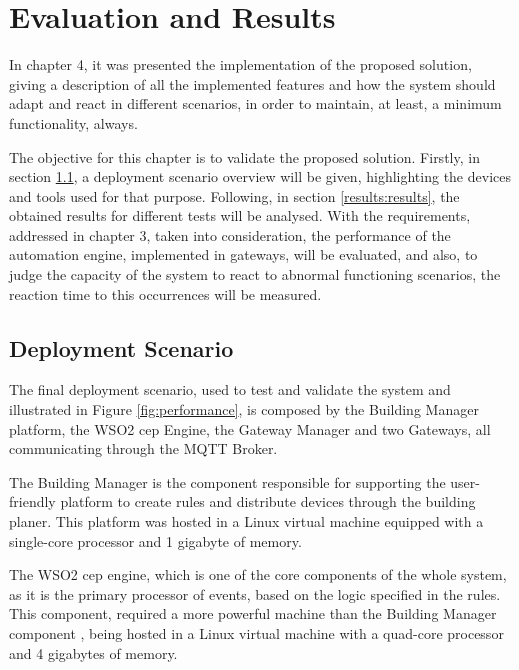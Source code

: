 \chapter{Evaluation and Results}
\label{chapter:evaluation_and_results}



In chapter 4, it was presented the implementation of the proposed solution, giving a description of all the implemented features and how the system should adapt and react in different scenarios, in order to maintain, at least, a minimum functionality, always.

The objective for this chapter is to validate the proposed solution. Firstly, in section \ref{results:scenario}, a deployment scenario overview will be given, highlighting the devices and tools used for that purpose. Following, in section \ref{results:results}, the obtained results for different tests will be analysed. With the requirements, addressed in chapter 3, taken into consideration, the performance of the automation engine, implemented in gateways, will be evaluated, and also, to judge the capacity of the system to react to abnormal functioning scenarios, the reaction time to this occurrences will be measured.

\newpage

\section{Deployment Scenario}
\label{results:scenario}



The final deployment scenario, used to test and validate the system and illustrated in Figure \ref{fig:performance}, is composed by the Building Manager platform, the WSO2 \ac{cep} Engine, the Gateway Manager and two Gateways, all communicating through the MQTT Broker. 

The Building Manager is the component responsible for supporting the user-friendly platform to create rules and distribute devices through the building planer. This platform was hosted in a Linux virtual machine equipped with a single-core processor and 1 gigabyte of memory.

The WSO2 \ac{cep} engine, which is one of the core components of the whole system, as it is the primary processor of events, based on the logic specified in the rules. This component, required a more powerful machine than the Building Manager component , being hosted in a Linux virtual machine with a quad-core processor and 4 gigabytes of memory.

